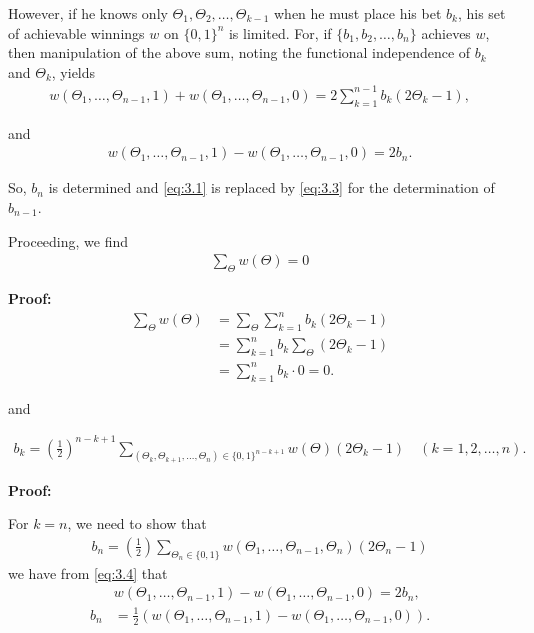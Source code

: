 \documentclass[11pt]{article}
\numberwithin{equation}{section}
\theoremstyle{boldStyle}
\begin{document}
However, if he knows only \(\Theta_1, \Theta_2, \ldots, \Theta_{k-1}\) when he must place his bet \(b_k\), his set of achievable winnings \(w\) on \(\{0, 1\}^n\) is limited. For, if \(\{b_1, b_2, \ldots, b_n\}\) achieves \(w\), then manipulation of the above sum, noting the functional independence of \(b_k\) and \(\Theta_k\), yields
\begin{align} \label{eq:3.3}
    w(\Theta_1, \ldots, \Theta_{n-1}, 1) + w(\Theta_1, \ldots, \Theta_{n-1}, 0) = 2 \sum_{k=1}^{n-1} b_k(2\Theta_k - 1),
\end{align}

and
\begin{align} \label{eq:3.4}
    w(\Theta_1, \ldots, \Theta_{n-1}, 1) - w(\Theta_1, \ldots, \Theta_{n-1}, 0) = 2b_n.
\end{align}

So, \(b_n\) is determined and \ref{eq:3.1} is replaced by \ref{eq:3.3} for the determination of \(b_{n-1}\). 

Proceeding, we find
\begin{align} \label{eq:3.5}
    \sum_{\Theta} w(\Theta) = 0
\end{align}

\textbf{Proof:}
\begin{align*}
    \sum_{\Theta} w(\Theta) &= \sum_{\Theta} \sum_{k=1}^n b_k(2\Theta_k - 1) \\
    &= \sum_{k=1}^n b_k \sum_{\Theta} (2\Theta_k - 1) \\
    &= \sum_{k=1}^n b_k \cdot 0 = 0.
\end{align*}

and 

\begin{align} \label{eq:3.6}
    b_k = (\frac{1}{2})^{n-k+1} \sum_{(\Theta_k, \Theta_{k+1}, \ldots, \Theta_n) \in \{0, 1\}^{n-k+1}} w(\Theta)(2\Theta_k - 1) \quad (k = 1, 2, \ldots, n).
\end{align}

\textbf{Proof:}

For \(k = n\), we need to show that
\begin{align*}
    b_n = \left(\frac{1}{2}\right) \sum_{\Theta_n \in \{0, 1\}} w(\Theta_1, \ldots, \Theta_{n-1}, \Theta_{n})(2\Theta_n - 1)
\end{align*}
we have from \ref{eq:3.4} that 
\begin{align*}
    &w(\Theta_1, \ldots, \Theta_{n-1}, 1) - w(\Theta_1, \ldots, \Theta_{n-1}, 0) = 2b_n, \\
    b_n &= \frac{1}{2}(w(\Theta_1, \ldots, \Theta_{n-1}, 1) - w(\Theta_1, \ldots, \Theta_{n-1}, 0)).
\end{align*}
\end{document}
